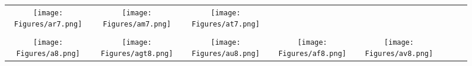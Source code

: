 \documentclass[journal]{IEEEtran}
\begin{document}
\begin{figure*}[!t]
\begin{tabular}{cccccccc}
		\hspace{0.4cm}
		\begin{minipage}{32pt}
			\texttt{[image: Figures/ar7.png]}
\end{minipage}
		&
		\hspace{0.4cm}
		\begin{minipage}{32pt}
			\texttt{[image: Figures/am7.png]}
\end{minipage}
		&
		\hspace{0.4cm}
		\begin{minipage}{32pt}
			\texttt{[image: Figures/at7.png]}
\end{minipage}
		\\
		\\
		\begin{minipage}{32pt}
			\texttt{[image: Figures/a8.png]}
\end{minipage}
		&
		\hspace{0.4cm}
		\begin{minipage}{32pt}
			\texttt{[image: Figures/agt8.png]}
\end{minipage}
		&
		\hspace{0.4cm}
		\begin{minipage}{30pt}
			\texttt{[image: Figures/au8.png]}
\end{minipage}
		&
		\hspace{0.4cm}
		\begin{minipage}{30pt}
			\texttt{[image: Figures/af8.png]}
\end{minipage}
		&
		\hspace{0.4cm}
		\begin{minipage}{30pt}
			\texttt{[image: Figures/av8.png]}
\end{minipage}
		&
	

\end{tabular}
\end{figure*}
\end{document}
